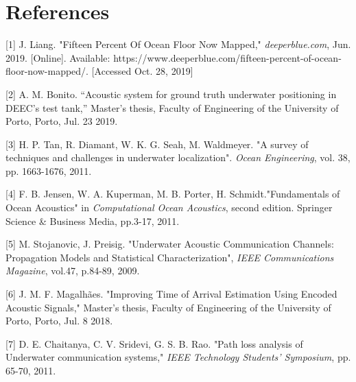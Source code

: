 \chapter{References} \label{chap:concl}




[1] J. Liang. "Fifteen Percent Of Ocean Floor Now Mapped," \textit{deeperblue.com}, Jun. 2019. [Online]. Available: https://www.deeperblue.com/fifteen-percent-of-ocean-floor-now-mapped/. [Accessed Oct. 28, 2019]
\label{r:deeperblue}

[2] A. M. Bonito. “Acoustic system for ground truth underwater positioning in DEEC’s test tank,” Master’s thesis, Faculty of Engineering of the University of Porto, Porto, Jul. 23 2019.
\label{r:afonso-thesis}

[3] H. P. Tan, R. Diamant, W. K. G. Seah, M. Waldmeyer. "A survey of techniques and challenges in underwater localization". \textit{Ocean Engineering}, vol. 38, pp. 1663-1676, 2011.
\label{r:survey-tech-chall}

[4] F. B. Jensen, W. A. Kuperman, M. B. Porter, H. Schmidt."Fundamentals of Ocean Acoustics" in \textit{Computational Ocean Acoustics}, second edition. Springer Science \& Business Media, pp.3-17, 2011. 
\label{r:ocean-acoust}

[5] M. Stojanovic, J. Preisig. "Underwater Acoustic Communication Channels: Propagation Models and Statistical Characterization", \textit{IEEE Communications Magazine}, vol.47, p.84-89, 2009.
\label{r:commchan}

[6] J. M. F. Magalh\~{a}es. "Improving Time of Arrival Estimation Using Encoded Acoustic Signals," Master’s thesis, Faculty of Engineering of the University of Porto, Porto, Jul. 8 2018.
\label{r:thesis-joao}

[7] D. E. Chaitanya, C. V. Sridevi, G. S. B. Rao. "Path loss analysis of Underwater communication systems," \textit{IEEE Technology Students' Symposium}, pp. 65-70, 2011.
\label{r:pathloss}


